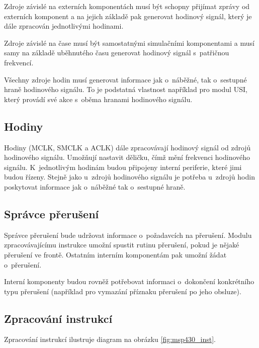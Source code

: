 Zdroje závislé na externích komponentách musí být schopny přijímat zprávy od externích komponent a na jejich základě pak generovat hodinový signál, který je dále zpracován jednotlivými hodinami.

Zdroje závislé na čase musí být samostatnými simulačními komponentami a musí samy na základě uběhnutého času generovat hodinový signál s~patřičnou frekvencí.

Všechny zdroje hodin musí generovat informace jak o~náběžné, tak o~sestupné hraně hodinového signálu. To je podstatná vlastnost například pro modul USI, který provádí své akce s~oběma hranami hodinového signálu.

\subsection{Hodiny}

Hodiny (MCLK, SMCLK a ACLK) dále zpracovávají hodinový signál od zdrojů hodinového signálu. Umožňují nastavit děličku, čímž mění frekvenci hodinového signálu. K~jednotlivým hodinám budou připojeny interní periferie, které jimi budou řízeny. Stejně jako u~zdrojů hodinového signálu je potřeba u~zdrojů hodin poskytovat informace jak o~náběžné tak o~sestupné hraně.

\subsection{Správce přerušení}

Správce přerušení bude udržovat informace o~požadavcích na přerušení. Modulu zpracovávajícímu instrukce umožní spustit rutinu přerušení, pokud je nějaké
přerušení ve frontě. Ostatním interním komponentám pak umožní žádat o~přerušení.

Interní komponenty budou rovněž potřebovat informaci o~dokončení konkrétního typu přerušení (například pro vymazání příznaku přerušení po jeho obsluze).

\subsection{Zpracování instrukcí}

Zpracování instrukcí ilustruje diagram na obrázku \ref{fig:msp430_inst}.

